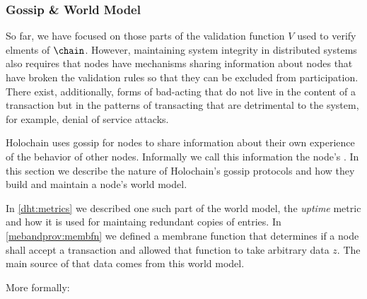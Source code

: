 \documentclass[twocolumn,showpacs,
  nofootinbib,aps,superscriptaddress,
  eqsecnum,prd,notitlepage,showkeys,10pt]{revtex4-1}
\begin{document}
\subsubsection{Gossip \& World Model}
\label{sec:gossip}

So far, we have focused on those parts of the validation function $V$ used to verify elments of $\chain$.  However, maintaining system integrity in distributed systems also requires that nodes have mechanisms sharing information about nodes that have broken the validation rules so that they can be excluded from participation. There exist, additionally, forms of bad-acting that do not live in the content of a transaction but in the patterns of transacting that are detrimental to the system, for example, denial of service attacks.

Holochain uses gossip for nodes to share information about their own experience of the behavior of other nodes.  Informally we call this information the node's . In this section we describe the nature of Holochain's gossip protocols and how they build and maintain a node's world model.

In \ref{dht:metrics} we described one such part of the world model, the \textit{uptime} metric and how it is used for maintaing redundant copies of entries.  In \ref{mebandprov:membfn} we defined a membrane function that determines if a node shall accept a transaction and allowed that function to take arbitrary data $z$.  The main source of that data comes from this world model.


More formally:
\end{document}
